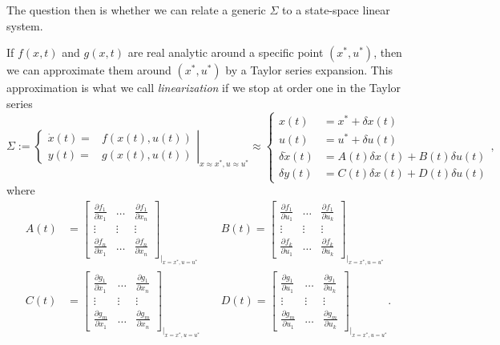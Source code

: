 The question then is whether we can relate a generic $\Sigma$ to a state-space linear system.

If $f(x,t)$ and $g(x,t)$ are real analytic around a specific point $(x^*,u^*)$, then we can approximate them around $(x^*,u^*)$ by a Taylor series expansion. This approximation is what we call \emph{linearization} if we stop at order one in the Taylor series
\begin{equation}
	\Sigma := \left.\begin{cases}
	\dot x(t) =& f(x(t),u(t)) \\ y(t) =& g(x(t),u(t))
	\end{cases}\right|_{x\approx x^*, u\approx u^*} \approx
	\begin{cases}
		x(t) &= x^* + \delta x(t) \\
		u(t) &= u^* + \delta u(t) \\
	\delta \dot x(t) &= A(t)\delta x(t) + B(t)\delta u(t) \\
	\delta y(t) &= C(t)\delta x(t) + D(t)\delta u(t)
	\end{cases}, \nonumber
\end{equation}
where
\begin{align}
	A(t) &= \begin{bmatrix}
		\frac{\partial f_1}{\partial x_1} & \dots & \frac{\partial f_1}{\partial x_n} \\
		\vdots & \vdots & \vdots \\
		\frac{\partial f_n}{\partial x_1} & \dots & \frac{\partial f_n}{\partial x_n}
	\end{bmatrix}_{|_{x=x^*, u=u^*}} \quad
	&B(t) = \begin{bmatrix}
		\frac{\partial f_1}{\partial u_1} & \dots & \frac{\partial f_1}{\partial u_k} \\
		\vdots & \vdots & \vdots \\
		\frac{\partial f_k}{\partial u_1} & \dots & \frac{\partial f_k}{\partial u_k}
	\end{bmatrix}_{|_{x=x^*, u=u^*}} \nonumber \\
	C(t) &= \begin{bmatrix}
		\frac{\partial g_1}{\partial x_1} & \dots & \frac{\partial g_1}{\partial x_n} \\
		\vdots & \vdots & \vdots \\
		\frac{\partial g_m}{\partial x_1} & \dots & \frac{\partial g_m}{\partial x_n}
	\end{bmatrix}_{|_{x=x^*, u=u^*}} \quad
	&D(t) = \begin{bmatrix}
		\frac{\partial g_1}{\partial u_1} & \dots & \frac{\partial g_1}{\partial u_k} \\
		\vdots & \vdots & \vdots \\
		\frac{\partial g_m}{\partial u_1} & \dots & \frac{\partial g_m}{\partial u_k}
	\end{bmatrix}_{|_{x=x^*, u=u^*}}. \nonumber
\end{align}
